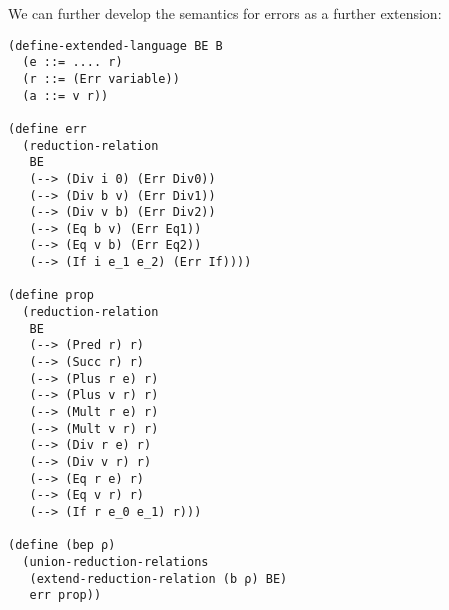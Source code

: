 We can further develop the semantics for errors as a further
extension:
\begin{verbatim}
(define-extended-language BE B
  (e ::= .... r)
  (r ::= (Err variable))
  (a ::= v r))

(define err
  (reduction-relation
   BE
   (--> (Div i 0) (Err Div0))
   (--> (Div b v) (Err Div1))
   (--> (Div v b) (Err Div2))
   (--> (Eq b v) (Err Eq1))
   (--> (Eq v b) (Err Eq2))
   (--> (If i e_1 e_2) (Err If))))

(define prop
  (reduction-relation
   BE
   (--> (Pred r) r)
   (--> (Succ r) r)
   (--> (Plus r e) r)
   (--> (Plus v r) r)
   (--> (Mult r e) r)
   (--> (Mult v r) r)
   (--> (Div r e) r)
   (--> (Div v r) r)
   (--> (Eq r e) r)
   (--> (Eq v r) r)
   (--> (If r e_0 e_1) r)))

(define (bep ρ)
  (union-reduction-relations
   (extend-reduction-relation (b ρ) BE)
   err prop))
\end{verbatim}
